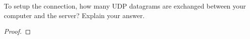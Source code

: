 \documentclass[../../main.tex]{subfiles}
\begin{document}
\begin{wts}
To setup the connection, how many UDP datagrams are exchanged between your computer and the server? Explain your answer.
\end{wts}
\begin{proof}

\end{proof}
\end{document}
